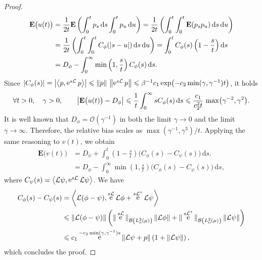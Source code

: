 \documentclass[11pt,a4paper]{article}
\DeclareMathOperator{\e}{e}
\newcommand{\expect}[0]{\mathbf{E}}
\renewcommand{\d}{\mathrm d}
\theoremstyle{plain}
\numberwithin{equation}{section}
\renewcommand{\leq}{\leqslant}
\begin{document}
\begin{proof}
    \begin{align*}
        \expect \bigl(u(t)\bigr)
        &= \frac{1}{2t} \expect \left( \int_{0}^{t} p_s \, \d s \int_{0}^{t} p_u \, \d u \right)
        = \frac{1}{2t} \left( \int_{0}^{t} \int_{0}^{t} \expect (p_s p_u) \, \d s \, \d u \right) \\
        &= \frac{1}{2t} \left( \int_{0}^{t} \int_{0}^{t} C_{\phi}(\abs{s - u}) \, \d s \, \d u \right)
        =  \int_{0}^{t} C_{\phi}(s) \left(1 - \frac{s}{t}\right) \d s  \\
        &= D_{\phi} - \int_{0}^{\infty} \min\left(1, \frac{s}{t}\right) C_{\phi}(s) \, \d s.
    \end{align*}
Since $\abs{C_{\phi}(s)} = \abs{\ip{p}{\e^{s \mathcal L} p}} \leq \norm{p} \, \norm{\e^{s \mathcal L} p} \leq \beta^{-1} c_1 \exp\bigl( - c_2 \min(\gamma, \gamma^{-1}) t\bigr)$, it holds
\[
    \forall t > 0, \quad \gamma > 0, \qquad
    \abs{\expect\bigl(u(t)\bigr) - D_{\phi}}
    \leq \frac{1}{t}\int_{0}^{\infty} s C_{\phi}(s) \, \d s
    \leq \frac{c_1}{c_2^2 t} \, \max\bigl(\gamma^{-2}, \gamma^2\bigr).
\]
It is well known that $D_{\phi} = \mathcal O(\gamma^{-1})$ in both the limit $\gamma \to 0$ and the limit $\gamma \to \infty$.
Therefore, the relative bias scales as $\max(\gamma^{-1}, \gamma^3) / t$.
Applying the same reasoning to $v(t)$, we obtain
\begin{align*}
    \expect \bigl(v(t)\bigr)
    &= D_{\psi} + \int_{0}^{t} \left(1 - \frac{s}{t}\right) \bigl( C_{\phi}(s) - C_{\psi}(s) \bigr) \, \d s. \\
    &= D_{\phi} - \int_{0}^{\infty} \min\left(1, \frac{s}{t}\right) \bigl( C_{\phi}(s) - C_{\psi}(s) \bigr) \, \d s,
\end{align*}
where $C_{\psi}(s) = \ip{\mathcal L \psi}{\e^{s \mathcal L} \mathcal L \psi}$.
We have
\begin{align*}
    C_{\phi}(s) - C_{\psi}(s)
    &= \ip{\mathcal L (\phi - \psi)}{\e^{s \mathcal L} \mathcal L \phi + \e^{s \mathcal L^*} \mathcal  L\psi} \\
    &\leq \norm{\mathcal L(\phi - \psi)}
    \left( \norm*{\e^{s \mathcal L}}[\mathcal B\left(L^2_0(\mu) \right)] \norm{\mathcal L \phi} + \norm*{\e^{s \mathcal L^*}}[\mathcal B\left(L^2_0(\mu) \right)] \norm{\mathcal L \psi} \right) \\
    &\leq c_1 \e^{-c_2 \min(\gamma, \gamma^{-1}) s} \norm{\mathcal L\psi + p}  \left(1 + \norm{\mathcal L \psi} \right),
\end{align*}
which concludes the proof.
\end{proof}
\end{document}
